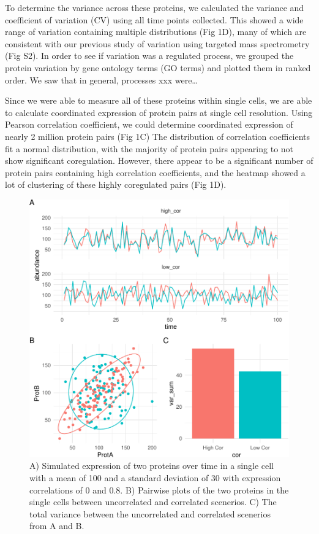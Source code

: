 \documentclass[11pt,]{article}
\begin{document}
To determine the variance across these proteins, we calculated the
variance and coefficient of variation (CV) using all time points
collected. This showed a wide range of variation containing multiple
distributions (Fig 1D), many of which are consistent with our previous
study of variation using targeted mass spectrometry (Fig S2). In order
to see if variation was a regulated process, we grouped the protein
variation by gene ontology terms (GO terms) and plotted them in ranked
order. We saw that in general, processes xxx were\ldots{}

Since we were able to measure all of these proteins within single cells,
we are able to calculate coordinated expression of protein pairs at
single cell resolution. Using Pearson correlation coefficient, we could
determine coordinated expression of nearly 2 million protein pairs (Fig
1C) The distribution of correlation coefficients fit a normal
distribution, with the majority of protein pairs appearing to not show
significant coregulation. However, there appear to be a significant
number of protein pairs containing high correlation coefficients, and
the heatmap showed a lot of clustering of these highly coregulated pairs
(Fig 1D).

\begin{figure}
\centering
\includegraphics{output/figures/figure_1-1.pdf}
\caption{A) Simulated expression of two proteins over time in a single
cell with a mean of 100 and a standard deviation of 30 with expression
correlations of 0 and 0.8. B) Pairwise plots of the two proteins in the
single cells between uncorrelated and correlated scenerios. C) The total
variance between the uncorrelated and correlated scenerios from A and
B.}
\end{figure}
\end{document}
